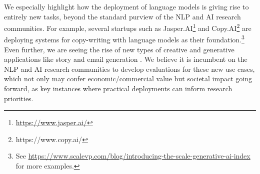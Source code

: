 We especially highlight how the deployment of language models is giving rise to entirely new tasks, beyond the standard purview of the NLP and AI research communities.
For example, several startups such as Jasper.AI\footnote{\url{https://www.jasper.ai/}} and Copy.AI\footnote{https://www.copy.ai/} are deploying systems for copy-writing with language models as their foundation.\footnote{See \url{https://www.scalevp.com/blog/introducing-the-scale-generative-ai-index} for more examples.} 
Even further, we are seeing the rise of new types of creative and generative applications like story and email generation \citep[see][]{lee2022coauthor, lee2022interaction}.
We believe it is incumbent on the NLP and AI research communities to develop evaluations for these new use cases, which not only may confer economic/commercial value but societal impact going forward, as key instances where practical deployments can inform research priorities.

